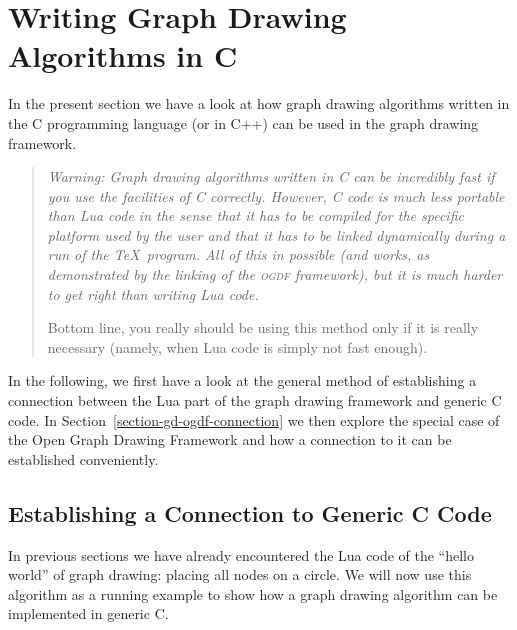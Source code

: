 %
%
%




\section{Writing Graph Drawing Algorithms in C}
\label{section-algorithms-in-c}


\bigskip

In the present section we have a look at how graph drawing
algorithms written in the C programming language (or in C++) can be
used in the graph drawing framework.

\begin{quote}
  \itshape Warning: Graph drawing algorithms written in C can be
  incredibly fast if you use the facilities of C
  correctly. \emph{However,} C code is much less portable than Lua 
  code in the sense that it has to be compiled for the specific
  platform used by the user and that it has to be linked dynamically
  during a run of the \TeX\ program. All of this in possible (and
  works, as demonstrated by the linking of the \textsc{ogdf}
  framework), but it is \emph{much} harder to get right than writing
  Lua code.

  Bottom line, you really should be using this method
  only if it is really necessary (namely, when Lua code is simply not
  fast enough).
\end{quote}

In the following, we first have a look at the general method of
establishing a connection between the Lua part of the graph drawing
framework and generic C code. In
Section~\ref{section-gd-ogdf-connection} we then explore the special
case of the Open Graph Drawing Framework and how a connection to it
can be established conveniently.


\subsection{Establishing a Connection to Generic C Code}

In previous sections we have already encountered the Lua code of the
``hello world'' of graph drawing: placing all nodes on a circle. We
will now use this algorithm as a running example to show how a graph
drawing algorithm can be implemented in generic C.

